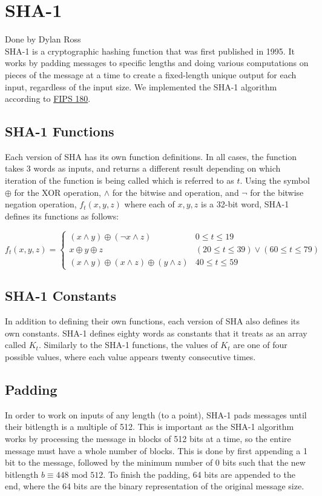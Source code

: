 \section{SHA-1}\label{sec:sha}
Done by Dylan Ross\\

	\medskip
	SHA-1 is a cryptographic hashing function that was first published in 1995. It works by padding messages to specific lengths and doing various
	computations on pieces of the message at a time to create a fixed-length unique output for each input, regardless of the input size. We implemented the SHA-1 algorithm according to 
	\href{https://nvlpubs.nist.gov/nistpubs/FIPS/NIST.FIPS.180-4.pdf}{FIPS 180}.

	\subsection{SHA-1 Functions}\label{sec:sha-functions}
		Each version of SHA has its own function definitions. In all cases, the function takes 3 words as inputs, and returns a different result depending on which iteration of the function
		is being called which is referred to as $t$. Using the symbol $\oplus$ for the XOR operation, $\land$ for the bitwise and operation, and $\neg$ for the bitwise negation operation, 
		$f_t(x,y,z)$ where each of $x,y,z$ is a 32-bit word, SHA-1 defines its functions as follows:
		\begin{center}
			$f_t(x,y,z) = \begin{cases}
				(x\land y) \oplus (\neg x\land z) & 0\le t\le19\\
				x\oplus y\oplus z & (20\le t\le39) \lor (60\le t\le79)\\
				(x\land y) \oplus (x\land z) \oplus (y\land z) & 40\le t\le59
				\end{cases}	 
			$
		\end{center}   

	\subsection{SHA-1 Constants}\label{sec:sha-constants}
		In addition to defining their own functions, each version of SHA also defines its own constants. SHA-1 defines eighty words as constants that it treats as an array called $K_t$. Similarly
		to the SHA-1 functions, the values of $K_t$ are one of four possible values, where each value appears twenty consecutive times.

	\subsection{Padding}\label{sec:sha-padding}
		In order to work on inputs of any length (to a point), SHA-1 pads messages until their bitlength is a multiple of 512. This is important as the SHA-1 algorithm works by processing the
		message in blocks of 512 bits at a time, so the entire message must have a whole number of blocks. This is done by first appending a 1 bit to the message, followed by the minimum number
		of 0 bits such that the new bitlength $b\equiv448\text{ mod }512$. To finish the padding, 64 bits are appended to the end, where the 64 bits are the binary representation of the
		original message size.

